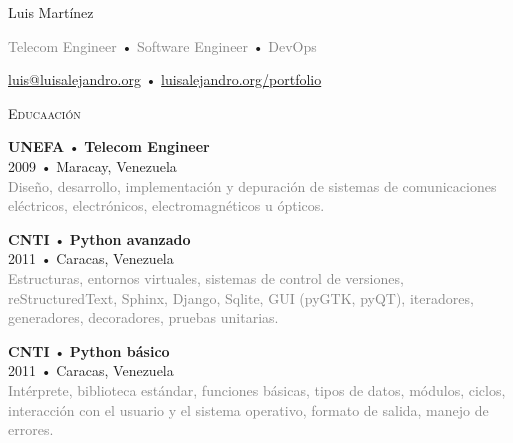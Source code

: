 \documentclass[12pt]{article}
\begin{document}
\centering
\begin{cv}{Luis Mart\'inez}
  
  \vspace{0.25em}
  \textcolor{gray}{Telecom Engineer} •
  \textcolor{gray}{Software Engineer} •
  \textcolor{gray}{DevOps}

  \vspace{0.125em}
  \href{mailto:luis@luisalejandro.org}{luis@luisalejandro.org} •
  \href{https://luisalejandro.org/portfolio}{luisalejandro.org/portfolio}
  \vspace{0.125em}

  \hrulefill

  \begin{minipage}[t]{0.35\textwidth}
    \vspace{0.125em}
    
    \begin{minipage}{\linewidth}
      \textrm{\textsc{\Large{Educaación}}}
      \newline
      \parbox[t]{\linewidth}{
        \textbf{UNEFA} • \textrm{\textbf{Telecom Engineer}}\\
        2009 • Maracay, Venezuela\\
        \footnotesize{\textcolor{gray}{Diseño, desarrollo, implementación y depuración de sistemas de comunicaciones eléctricos, electrónicos, electromagnéticos u ópticos.}}\\
      }
      \newline
      \parbox[t]{\linewidth}{
        \textbf{CNTI} • \textrm{\textbf{Python avanzado}}\\
        2011 • Caracas, Venezuela\\
        \footnotesize{\textcolor{gray}{Estructuras, entornos virtuales, sistemas de control de versiones, reStructuredText, Sphinx, Django, Sqlite, GUI (pyGTK, pyQT), iteradores, generadores, decoradores, pruebas unitarias.}}\\
      }
      \newline
      \parbox[t]{\linewidth}{
        \textbf{CNTI} • \textrm{\textbf{Python básico}}\\
        2011 • Caracas, Venezuela\\
        \footnotesize{\textcolor{gray}{Intérprete, biblioteca estándar, funciones básicas, tipos de datos, módulos, ciclos, interacción con el usuario y el sistema operativo, formato de salida, manejo de errores.}}\\
      }
      \newline
    \end{minipage}


\end{minipage}
\end{cv}
\end{document}
